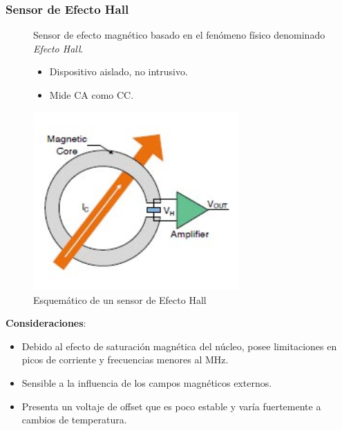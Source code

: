\documentclass[10pt]{beamer}
\theoremstyle{remark}
\theoremstyle{definition}
\begin{document}
\begin{frame}[allowframebreaks]
  \frametitle{Sensor de Efecto Hall}
  \begin{figure}[h!]
	\begin{minipage}{0.45\textwidth}
		Sensor de efecto magnético basado en el fenómeno físico denominado \emph{Efecto Hall}.
	  \begin{itemize}		  
		\item Dispositivo aislado, no intrusivo.
		\item Mide CA como CC.
	  \end{itemize}
	\end{minipage}
	\hspace{10pt}
	\begin{minipage}{0.45\textwidth}
	  \centering
	  \includegraphics[width=0.7\textwidth]{./images/Open-loop_Hall_Sensor.jpg}
	  \caption{Esquemático de un sensor de Efecto Hall}
	  \label{sch_hall}
	\end{minipage}
  \end{figure}
  \textbf{Consideraciones}:
  \begin{itemize}
	\item Debido al efecto de saturación magnética del núcleo, posee
	  limitaciones en picos de corriente y frecuencias menores al MHz.
	\item Sensible a la influencia de los campos magnéticos externos.
	\item Presenta un voltaje de offset que es poco estable y varía
	  fuertemente a cambios de temperatura.
  \end{itemize}
\end{frame}
\end{document}
